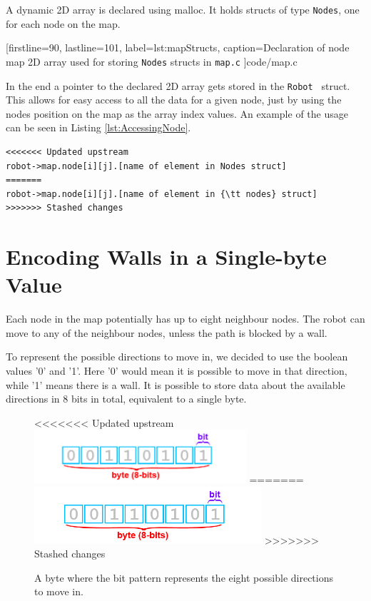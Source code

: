 A dynamic 2D array is declared using malloc. It holds structs of type {\tt Nodes}, one for each node on the map. 

[firstline=90,			%
lastline=101,			%
label=lst:mapStructs,	%
caption={Declaration of node map 2D array used for storing {\tt Nodes} structs in {\tt map.c}}
]{code/map.c}

In the end a pointer to the declared 2D array gets stored in the {\tt Robot } struct.
This allows for easy access to all the data for a given node, just by using the nodes position on the map as the array index values. An example of the usage can be seen in Listing \ref{lst:AccessingNode}. 

\begin{lstlisting}[caption={Example of accessing a node in the node map stored in a 2D array in {\tt map.c}},label={lst:AccessingNode}]
<<<<<<< Updated upstream
robot->map.node[i][j].[name of element in Nodes struct]
=======
robot->map.node[i][j].[name of element in {\tt nodes} struct]
>>>>>>> Stashed changes
\end{lstlisting}

\section{Encoding Walls in a Single-byte Value}
\label{sec:map_hex}
Each node in the map potentially has up to eight neighbour nodes. 
The robot can move to any of the neighbour nodes, unless the path is blocked by a wall.

To represent the possible directions to move in, we decided to use the boolean values '0' and '1'. 
Here '0' would mean it is possible to move in that direction, while '1' means there is a wall.
It is possible to store data about the available directions in 8 bits in total, equivalent to a single byte.

\begin{figure}[htp]
    \centering
<<<<<<< Updated upstream
        \includegraphics[width=0.70\textwidth]{figures/map/bitbyte.png}%
=======
        \includegraphics[width=0.75\textwidth]{figures/map/bitbyte.png}%
>>>>>>> Stashed changes
    \caption{A byte where the bit pattern represents the eight possible directions to move in.}
    \label{fig:bitbyte}
\end{figure}

